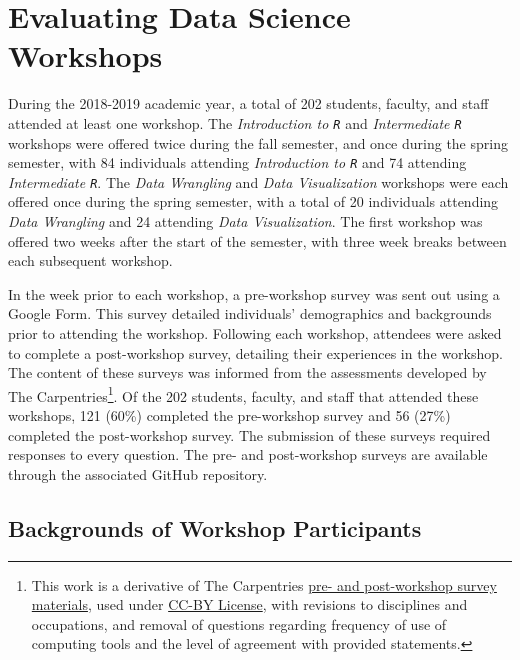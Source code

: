 \documentclass[12pt]{article}
\newcommand{\R}{\texttt{R}}
\begin{document}
\section{Evaluating Data Science Workshops}
\label{sec:implement}

\noindent During the 2018-2019 academic year, a total of 202 students, faculty,
and staff attended at least one workshop. The \emph{Introduction to \R} and
\emph{Intermediate \R} workshops were offered twice during the fall semester,
and once during the spring semester, with 84 individuals attending 
\emph{Introduction to \R} and 74 attending \emph{Intermediate \R}. The 
\emph{Data Wrangling} and \emph{Data Visualization} workshops were each offered
once during the spring semester, with a total of 20 individuals attending 
\emph{Data Wrangling} and 24 attending \emph{Data Visualization}. The first
workshop was offered two weeks after the start of the semester, with three week
breaks between each subsequent workshop. 

\enlargethispage{0.25in}

\quad In the week prior to each workshop, a pre-workshop survey was
sent out using a Google Form. This survey detailed individuals' demographics and
backgrounds prior to attending the workshop. Following each workshop, attendees
were asked to complete a post-workshop survey, detailing their experiences in
the workshop.  The content of these surveys was informed from the assessments 
developed by The Carpentries\footnote{This work is a
derivative of The Carpentries \href{https://carpentries.org/assessment/}{pre-
and post-workshop survey materials}, used under 
\href{https://creativecommons.org/licenses/by/4.0/}{CC-BY License}, with
revisions to disciplines and occupations, and removal of questions regarding
frequency of use of computing tools and the level of agreement with provided
statements.}. Of the 202 students, faculty, and staff that attended these
workshops, 121 (60\%) completed the pre-workshop survey and 56 (27\%) completed
the post-workshop survey. The submission of these surveys required responses to
every question. The pre- and post-workshop surveys are available through the 
associated GitHub repository.  


\subsection{Backgrounds of Workshop Participants}
\end{document}

